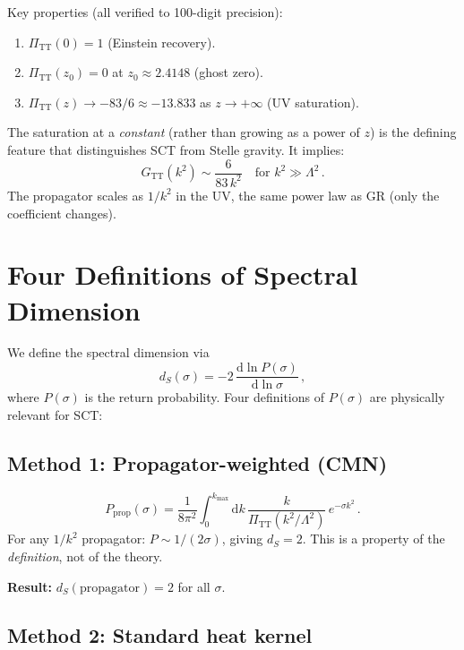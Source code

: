 \documentclass[11pt,a4paper]{article}
\newcommand{\dd}{\mathrm{d}}
\newcommand{\PiTT}{\Pi_{\mathrm{TT}}}
\newcommand{\ds}{d_S}
\begin{document}
Key properties (all verified to 100-digit precision):
\begin{enumerate}[nosep]
  \item $\PiTT(0) = 1$ (Einstein recovery).
  \item $\PiTT(z_0) = 0$ at $z_0 \approx 2.4148$ (ghost zero).
  \item $\PiTT(z) \to -83/6 \approx -13.833$ as $z \to +\infty$ (UV saturation).
\end{enumerate}

The saturation at a \emph{constant} (rather than growing as a power of $z$)
is the defining feature that distinguishes SCT from Stelle gravity.
It implies:
\begin{equation}\label{eq:UV-scaling}
  G_{\mathrm{TT}}(k^2) \sim \frac{6}{83\,k^2} \quad
  \text{for } k^2 \gg \Lambda^2\,.
\end{equation}
The propagator scales as $1/k^2$ in the UV, the same power law as GR
(only the coefficient changes).


\section{Four Definitions of Spectral Dimension}
\label{sec:definitions}

We define the spectral dimension via
\begin{equation}
  \ds(\sigma) = -2\,\frac{\dd\ln P(\sigma)}{\dd\ln\sigma}\,,
\end{equation}
where $P(\sigma)$ is the return probability. Four definitions of
$P(\sigma)$ are physically relevant for SCT:

\subsection{Method 1: Propagator-weighted (CMN)}

\begin{equation}\label{eq:P-CMN}
  P_{\mathrm{prop}}(\sigma) = \frac{1}{8\pi^2}\int_0^{k_{\max}}
    \dd k\,\frac{k}{\PiTT(k^2/\Lambda^2)}\,e^{-\sigma k^2}\,.
\end{equation}
For any $1/k^2$ propagator: $P \sim 1/(2\sigma)$, giving $\ds = 2$.
This is a property of the \emph{definition}, not of the theory.

\textbf{Result:} $\ds(\mathrm{propagator}) = 2$ for all $\sigma$.

\subsection{Method 2: Standard heat kernel}
\end{document}
